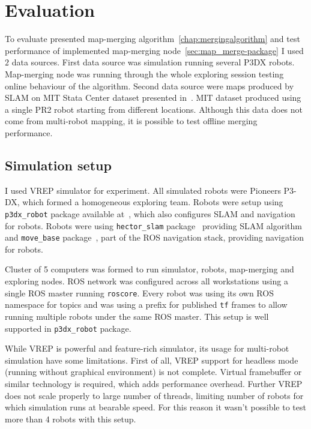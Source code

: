 \chapter{Evaluation}
\label{chap:evaluation}

To evaluate presented map-merging algorithm~\ref{chap:mergingalgorithm} and test performance of implemented map-merging node~\ref{sec:map_merge-package} I used $2$ data sources. First data source was simulation running several P3DX robots. Map-merging node was running through the whole exploring session testing online behaviour of the algorithm. Second data source were maps produced by \gls{SLAM} on \gls{MIT} Stata Center dataset presented in~\cite{Fallon2013}. \gls{MIT} dataset produced using a single PR2 robot starting from different locations. Although this data does not come from multi-robot mapping, it is possible to test offline merging performance.

\section{Simulation setup}

I used \gls{VREP} simulator for experiment. All simulated robots were Pioneers P3-DX, which formed a homogeneous exploring team. Robots were setup using \texttt{p3dx\_robot} package available at~\cite{GitHubRoboRescue}, which also configures \gls{SLAM} and navigation for robots. Robots were using \texttt{hector\_slam} package~\cite{2013:RoboCup} providing \gls{SLAM} algorithm and \texttt{move\_base} package~\cite{Marder2016}, part of the \gls{ROS} navigation stack, providing navigation for robots.

Cluster of 5 computers was formed to run simulator, robots, map-merging and exploring nodes. \gls{ROS} network was configured across all workstations using a single \gls{ROS} master running \texttt{roscore}. Every robot was using its own \gls{ROS} namespace for topics and was using a prefix for published \texttt{tf} frames to allow running multiple robots under the same \gls{ROS} master. This setup is well supported in \texttt{p3dx\_robot} package.

While \gls{VREP} is powerful and feature-rich simulator, its usage for multi-robot simulation have some limitations. First of all, \gls{VREP} support for headless mode (running without graphical environment) is not complete. Virtual framebuffer or similar technology is required, which adds performance overhead. Further \gls{VREP} does not scale properly to large number of threads, limiting number of robots for which simulation runs at bearable speed. For this reason it wasn't possible  to test more than 4 robots with this setup.

